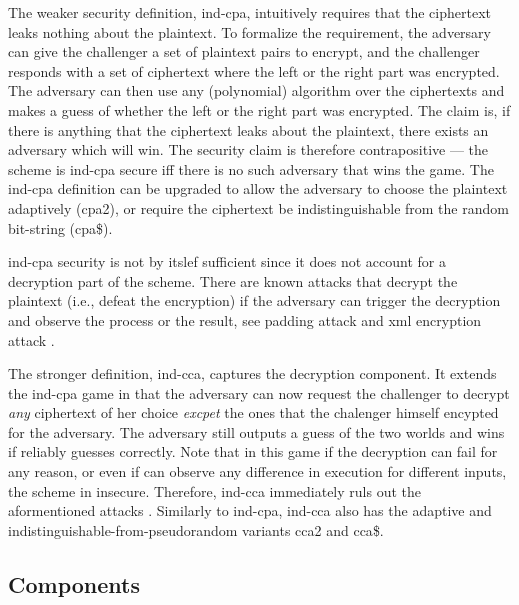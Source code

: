 			The weaker security definition, \acrfull{ind-cpa}, intuitively requires that the ciphertext leaks nothing about the plaintext.
			To formalize the requirement, the adversary can give the challenger a set of plaintext pairs to encrypt, and the challenger responds with a set of ciphertext where the left or the right part was encrypted.
			The adversary can then use any (polynomial) algorithm over the ciphertexts and makes a guess of whether the left or the right part was encrypted.
			The claim is, if there is anything that the ciphertext leaks about the plaintext, there exists an adversary which will win.
			The security claim is therefore contrapositive --- the scheme is \acrshort{ind-cpa} secure iff there is no such adversary that wins the game.
			The \acrshort{ind-cpa} definition can be upgraded to allow the adversary to choose the plaintext adaptively (\acrshort{cpa}2), or require the ciphertext be indistinguishable from the random bit-string (\acrshort{cpa}\$).

			\acrshort{ind-cpa} security is not by itslef sufficient since it does not account for a decryption part of the scheme.
			There are known attacks that decrypt the plaintext (i.e., defeat the encryption) if the adversary can trigger the decryption and observe the process or the result, see padding attack \cite{padding-attack} and \acrshort{xml} encryption attack \cite{xml-break-encryption}.

			The stronger definition, \acrfull{ind-cca}, captures the decryption component.
			It extends the \acrshort{ind-cpa} game in that the adversary can now request the challenger to decrypt \emph{any} ciphertext of her choice \emph{excpet} the ones that the chalenger himself encypted for the adversary.
			The adversary still outputs a guess of the two worlds and wins if reliably guesses correctly.
			Note that in this game if the decryption can fail for any reason, or even if \adversary{} can observe any difference in execution for different inputs, the scheme in insecure.
			Therefore, \acrshort{ind-cca} immediately ruls out the aformentioned attacks \cite{padding-attack,xml-break-encryption}.
			Similarly to \acrshort{ind-cpa}, \acrshort{ind-cca} also has the adaptive and indistinguishable\hyp{}from\hyp{}pseudorandom variants \acrshort{cca}2 and \acrshort{cca}\$.

		\subsection{Components}

